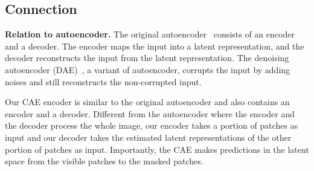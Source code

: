 \documentclass[twocolumn]{svjour3}          \smartqed  \usepackage{graphicx}
\begin{document}
\subsection{Connection}
\noindent\textbf{Relation to autoencoder.}
The original autoencoder~\cite{phdthesis_LeCun,gallinari1987memoires,hinton1994autoencoders} consists of
an encoder and a decoder.
The encoder maps the input into a latent representation,
and the decoder reconstructs the input
from the latent representation.
The denoising autoencoder (DAE)~\cite{VincentLLBM10},
a variant of autoencoder,
corrupts the input by adding noises
and still reconstructs
the non-corrupted input.

Our CAE encoder is similar
to the original autoencoder
and also contains an encoder and a decoder.
Different from the autoencoder
where the encoder and the decoder
process the whole image,
our encoder takes a portion of patches as input
and our decoder takes
the estimated latent representations
of the other portion of patches
as input.
Importantly,
the CAE makes predictions
in the latent space
from the visible patches
to the masked patches.
\end{document}
